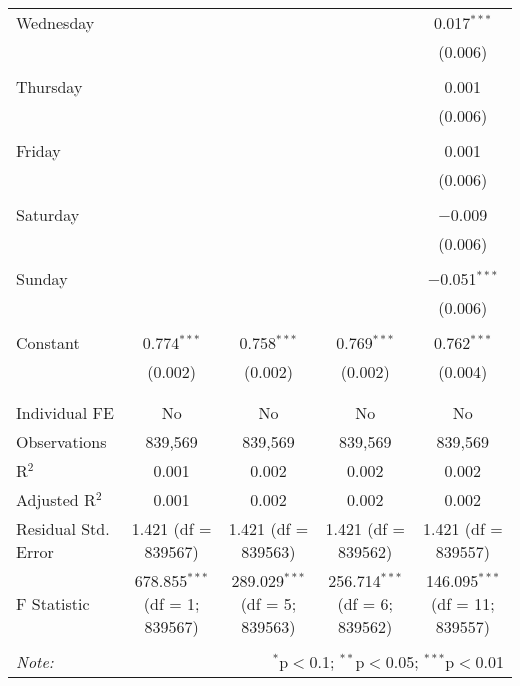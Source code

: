 \documentclass[
]{article}
\begin{document}
\begin{table}[!htbp]
{\begin{tabular}{@{\extracolsep{5pt}}lcccc}
 Wednesday &  &  &  & 0.017$^{***}$ \\ 
  &  &  &  & (0.006) \\ 
  & & & & \\ 
 Thursday &  &  &  & 0.001 \\ 
  &  &  &  & (0.006) \\ 
  & & & & \\ 
 Friday &  &  &  & 0.001 \\ 
  &  &  &  & (0.006) \\ 
  & & & & \\ 
 Saturday &  &  &  & $-$0.009 \\ 
  &  &  &  & (0.006) \\ 
  & & & & \\ 
 Sunday &  &  &  & $-$0.051$^{***}$ \\ 
  &  &  &  & (0.006) \\ 
  & & & & \\ 
 Constant & 0.774$^{***}$ & 0.758$^{***}$ & 0.769$^{***}$ & 0.762$^{***}$ \\ 
  & (0.002) & (0.002) & (0.002) & (0.004) \\ 
  & & & & \\ 
\hline \\[-1.8ex] 
Individual FE & No & No & No & No \\ 
Observations & 839,569 & 839,569 & 839,569 & 839,569 \\ 
R$^{2}$ & 0.001 & 0.002 & 0.002 & 0.002 \\ 
Adjusted R$^{2}$ & 0.001 & 0.002 & 0.002 & 0.002 \\ 
Residual Std. Error & 1.421 (df = 839567) & 1.421 (df = 839563) & 1.421 (df = 839562) & 1.421 (df = 839557) \\ 
F Statistic & 678.855$^{***}$ (df = 1; 839567) & 289.029$^{***}$ (df = 5; 839563) & 256.714$^{***}$ (df = 6; 839562) & 146.095$^{***}$ (df = 11; 839557) \\ 
\hline 
\hline \\[-1.8ex] 
\textit{Note:}  & \multicolumn{4}{r}{$^{*}$p$<$0.1; $^{**}$p$<$0.05; $^{***}$p$<$0.01} \\ 
\end{tabular}
} 
\end{table} 
\newpage
\end{document}
